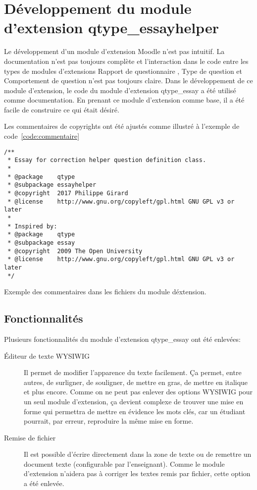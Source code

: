 \chapter{Développement du module d'extension \og qtype\_essayhelper \fg{} }

Le développement d'un module d'extension Moodle n'est pas intuitif.
La documentation n'est pas toujours complète et l'interaction dans le code entre les types de modules d'extensions \og Rapport de questionnaire \fg{}, \og Type de question \fg{} et \og Comportement de question \fg{} n'est pas toujours claire.
Dans le développement de ce module d'extension, le code du module d'extension \og qtype\_essay \fg{} a été utilisé comme documentation.
En prenant ce module d'extension comme base, il a été facile de construire ce qui était désiré.

Les commentaires de copyrights ont été ajustés comme illustré à l'exemple de code~\ref{code:commentaire}

\begin{lstfloat}
\begin{lstlisting}[frame=l]
/**
 * Essay for correction helper question definition class.
 *
 * @package    qtype
 * @subpackage essayhelper
 * @copyright  2017 Philippe Girard
 * @license    http://www.gnu.org/copyleft/gpl.html GNU GPL v3 or later
 *
 * Inspired by:
 * @package    qtype
 * @subpackage essay
 * @copyright  2009 The Open University
 * @license    http://www.gnu.org/copyleft/gpl.html GNU GPL v3 or later
 */
\end{lstlisting}
\caption{Exemple des commentaires dans les fichiers du module d\'extension.}
\label{code:commentaire}
\end{lstfloat}

\section{Fonctionnalités}

Plusieurs fonctionnalités du module d'extension \og qtype\_essay \fg{} ont été enlevées:

\begin{description}
  \item[Éditeur de texte WYSIWIG]
  
  Il permet de modifier l'apparence du texte facilement.
  Ça permet, entre autres, de surligner, de souligner, de mettre en gras, de mettre en italique et plus encore.
  Comme on ne peut pas enlever des options WYSIWIG pour un seul module d'extension, ça devient complexe de trouver une mise en forme qui permettra de mettre en évidence les mots clés, car un étudiant pourrait, par erreur, reproduire la même mise en forme.
  
  \item[Remise de fichier]
  
  Il est possible d'écrire directement dans la zone de texte ou de remettre un document texte (configurable par l'enseignant).
  Comme le module d'extension n'aidera pas à corriger les textes remis par fichier, cette option a été enlevée.
\end{description}

